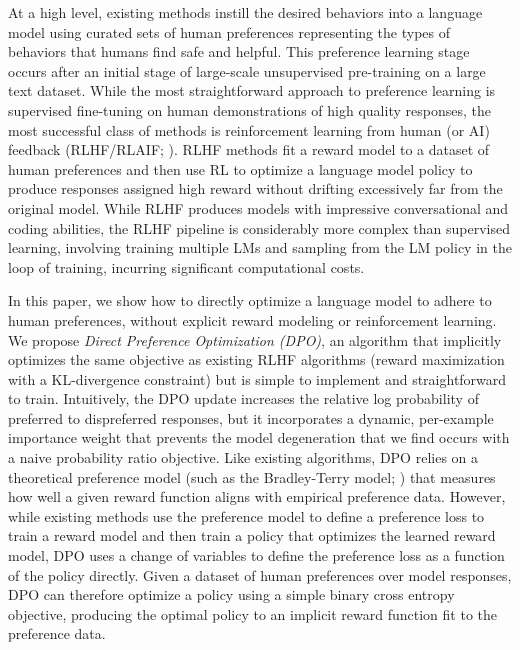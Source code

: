 At a high level, existing methods instill the desired behaviors into a language model using curated sets of human preferences representing the types of behaviors that humans find safe and helpful. This preference learning stage occurs after an initial stage of large-scale unsupervised pre-training on a large text dataset. While the most straightforward approach to preference learning is supervised fine-tuning on human demonstrations of high quality responses, the most successful class of methods is reinforcement learning from human (or AI) feedback (RLHF/RLAIF; \citep{christiano2017deep,bai2022constitutional}). RLHF methods fit a reward model to a dataset of human preferences and then use RL to optimize a language model policy to produce responses assigned high reward without drifting excessively far from the original model. While RLHF produces models with impressive conversational and coding abilities, the RLHF pipeline is considerably more complex than supervised learning, involving training multiple LMs and sampling from the LM policy in the loop of training, incurring significant computational costs.

In this paper, we show how to directly optimize a language model to adhere to human preferences, without explicit reward modeling or reinforcement learning. We propose
\textit{{Direct Preference Optimization} (DPO)}, an algorithm that implicitly optimizes the same objective as existing RLHF algorithms (reward maximization with a KL-divergence constraint) but is simple to implement and straightforward to train. Intuitively, the {DPO} update increases the relative log probability of preferred to dispreferred responses, but it incorporates a dynamic, per-example importance weight that prevents the model degeneration that we find occurs with a naive probability ratio objective. Like existing algorithms, {DPO} relies on a theoretical preference model (such as the Bradley-Terry model; \cite{bradley1952rankanalysis}) that measures how well a given reward function aligns with empirical preference data. However, while existing methods use the preference model to define a preference loss to train a reward model and then train a policy that optimizes the learned reward model, {DPO} uses a change of variables to define the preference loss as a function of the policy directly. Given a dataset of human preferences over model responses, {DPO} can therefore optimize a policy using a simple binary cross entropy objective, producing the optimal policy to an implicit reward function fit to the preference data.

